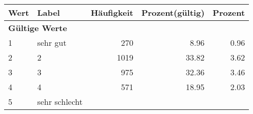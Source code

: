      \begin{longtable}{lXrrr}
     \toprule
     \textbf{Wert} & \textbf{Label} & \textbf{Häufigkeit} & \textbf{Prozent(gültig)} & \textbf{Prozent} \\
     \endhead
     \midrule
     \multicolumn{5}{l}{\textbf{Gültige Werte}}\\

     1 &
     \multicolumn{1}{X}{ sehr gut   } &


       \num{270} &
       \num[round-mode=places,round-precision=2]{8.96} &
         \num[round-mode=places,round-precision=2]{0.96} \\

     2 &
     \multicolumn{1}{X}{ 2   } &


       \num{1019} &
       \num[round-mode=places,round-precision=2]{33.82} &
         \num[round-mode=places,round-precision=2]{3.62} \\

     3 &
     \multicolumn{1}{X}{ 3   } &


       \num{975} &
       \num[round-mode=places,round-precision=2]{32.36} &
         \num[round-mode=places,round-precision=2]{3.46} \\

     4 &
     \multicolumn{1}{X}{ 4   } &


       \num{571} &
       \num[round-mode=places,round-precision=2]{18.95} &
         \num[round-mode=places,round-precision=2]{2.03} \\

     5 &
     \multicolumn{1}{X}{ sehr schlecht   } &



\end{longtable}
